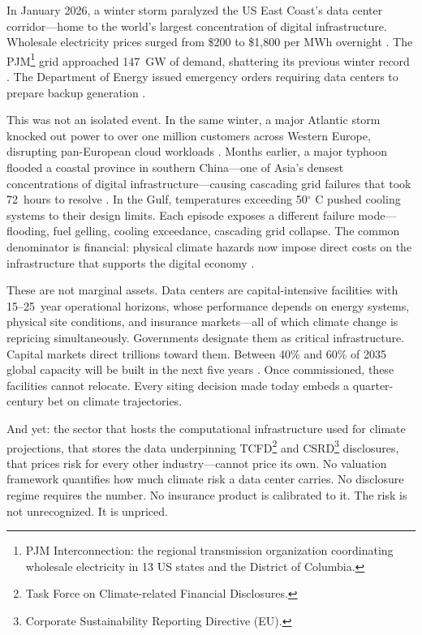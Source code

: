 \begin{twocolbody}

\noindent In January 2026, a winter storm paralyzed the US East Coast's data center corridor---home to the world's largest concentration of digital infrastructure. Wholesale electricity prices surged from \$200 to \$1{,}800 per MWh overnight \citep{cnbc2026storm}. The PJM\footnote{PJM Interconnection: the regional transmission organization coordinating wholesale electricity in 13 US states and the District of Columbia.} grid approached 147~GW of demand, shattering its previous winter record \citep{pjminsidelines2026}. The Department of Energy issued emergency orders requiring data centers to prepare backup generation \citep{bloomberg2026storm}.

This was not an isolated event. In the same winter, a major Atlantic storm knocked out power to over one million customers across Western Europe, disrupting pan-European cloud workloads \citep{gallagherre2026}. Months earlier, a major typhoon flooded a coastal province in southern China---one of Asia's densest concentrations of digital infrastructure---causing cascading grid failures that took 72~hours to resolve \citep{gallagherre2026}. In the Gulf, temperatures exceeding 50$^\circ$ C pushed cooling systems to their design limits. Each episode exposes a different failure mode---flooding, fuel gelling, cooling exceedance, cascading grid collapse. The common denominator is financial: physical climate hazards now impose direct costs on the infrastructure that supports the digital economy \citep{forzieri2016}.

These are not marginal assets. Data centers are capital-intensive facilities with 15--25~year operational horizons, whose performance depends on energy systems, physical site conditions, and insurance markets---all of which climate change is repricing simultaneously. Governments designate them as critical infrastructure. Capital markets direct trillions toward them. Between 40\% and 60\% of 2035 global capacity will be built in the next five years \citep{iea2025energyai}. Once commissioned, these facilities cannot relocate. Every siting decision made today embeds a quarter-century bet on climate trajectories.

And yet: the sector that hosts the computational infrastructure used for climate projections, that stores the data underpinning TCFD\footnote{Task Force on Climate-related Financial Disclosures.} and CSRD\footnote{Corporate Sustainability Reporting Directive (EU).} disclosures, that prices risk for every other industry---cannot price its own. No valuation framework quantifies how much climate risk a data center carries. No disclosure regime requires the number. No insurance product is calibrated to it. The risk is not unrecognized. It is unpriced.

\end{twocolbody}

